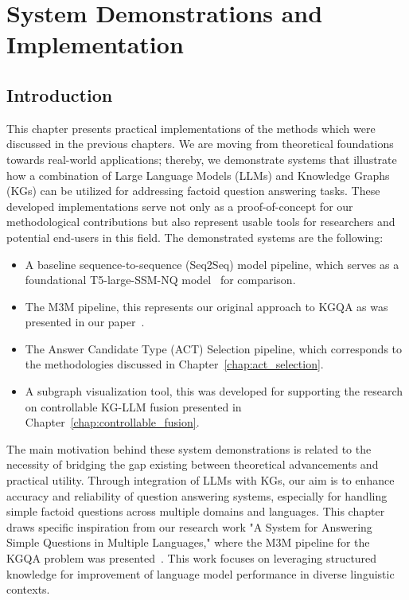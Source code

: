 \chapter{System Demonstrations and Implementation}
\label{chap:system_demos}

\section{Introduction}
\label{sec:system_demos:intro}
This chapter presents practical implementations of the methods which were discussed in the previous chapters. We are moving from theoretical foundations towards real-world applications; thereby, we demonstrate systems that illustrate how a combination of Large Language Models (LLMs) and Knowledge Graphs (KGs) can be utilized for addressing factoid question answering tasks. These developed implementations serve not only as a proof-of-concept for our methodological contributions but also represent usable tools for researchers and potential end-users in this field.
The demonstrated systems are the following:
\begin{itemize}
    \item A baseline sequence-to-sequence (Seq2Seq) model pipeline, which serves as a foundational T5-large-SSM-NQ model~\cite{DBLP:journals/corr/abs-1910-10683} for comparison.
    \item The M3M pipeline, this represents our original approach to KGQA as was presented in our paper~\cite{DBLP:conf/acl/RazzhigaevSMBP23}.
    \item The Answer Candidate Type (ACT) Selection pipeline, which corresponds to the methodologies discussed in Chapter~\ref{chap:act_selection}.
    \item A subgraph visualization tool, this was developed for supporting the research on controllable KG-LLM fusion presented in Chapter~\ref{chap:controllable_fusion}.
\end{itemize}
The main motivation behind these system demonstrations is related to the necessity of bridging the gap existing between theoretical advancements and practical utility. Through integration of LLMs with KGs, our aim is to enhance accuracy and reliability of question answering systems, especially for handling simple factoid questions across multiple domains and languages. This chapter draws specific inspiration from our research work "A System for Answering Simple Questions in Multiple Languages," where the M3M pipeline for the KGQA problem was presented~\cite{DBLP:conf/acl/RazzhigaevSMBP23}. This work focuses on leveraging structured knowledge for improvement of language model performance in diverse linguistic contexts.

